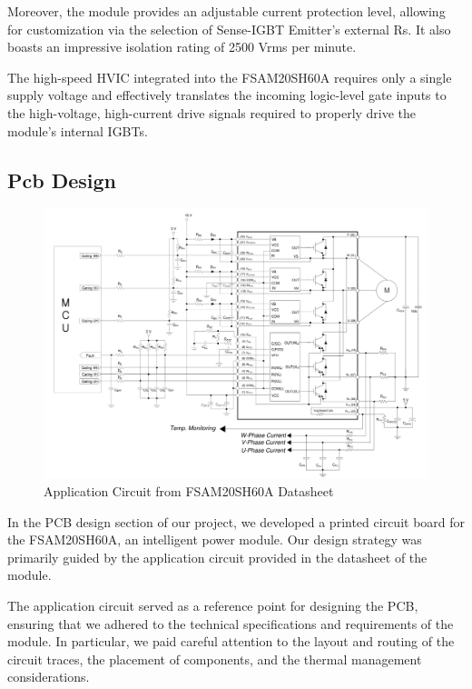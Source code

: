 Moreover, the module provides an adjustable current protection level, allowing for customization via the selection of Sense-IGBT Emitter's external Rs. It also boasts an impressive isolation rating of 2500 Vrms per minute. 

The high-speed HVIC integrated into the FSAM20SH60A requires only a single supply voltage and effectively translates the incoming logic-level gate inputs to the high-voltage, high-current drive signals required to properly drive the module's internal IGBTs. 



\subsection{Pcb Design}

\begin{figure}[H]
	\includegraphics[width=6in]{sections/section4/images/PCBDesign/ApplicationCircuitfromDatasheet.png}
	\caption{Application Circuit from FSAM20SH60A Datasheet}
\end{figure}

In the PCB design section of our project, we developed a printed circuit board for the FSAM20SH60A, an intelligent power module. Our design strategy was primarily guided by the application circuit provided in the datasheet of the module. 

The application circuit served as a reference point for designing the PCB, ensuring that we adhered to the technical specifications and requirements of the module. In particular, we paid careful attention to the layout and routing of the circuit traces, the placement of components, and the thermal management considerations. 

